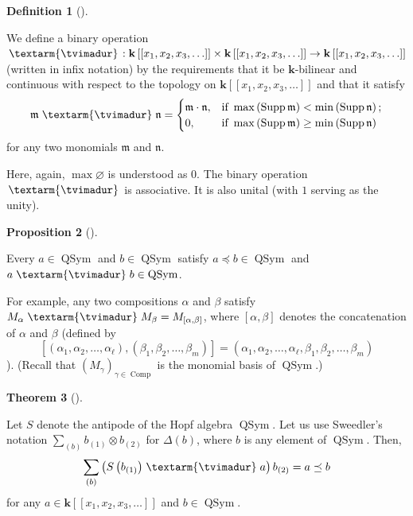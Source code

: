 \documentclass
[numbers=enddot,12pt,final,onecolumn,notitlepage,abstracton]{scrartcl}%
\theoremstyle{definition}
\newtheorem{theo}{Theorem}[section]
\newenvironment{theorem}[1][]
{\begin{theo}[#1]\begin{leftbar}}
{\end{leftbar}\end{theo}}
\newtheorem{prop}[theo]{Proposition}
\newenvironment{proposition}[1][]
{\begin{prop}[#1]\begin{leftbar}}
{\end{leftbar}\end{prop}}
\newtheorem{defi}[theo]{Definition}
\newenvironment{definition}[1][]
{\begin{defi}[#1]\begin{leftbar}}
{\end{leftbar}\end{defi}}
\newenvironment{verlong}{}{}
\newcommand{\tvi}{\left. \textarm{\tvimadur} \right.}
\let\sumnonlimits\sum
\renewcommand{\sum}{\sumnonlimits\limits}
\begin{document}
\begin{verlong}
\begin{definition}
We define a binary operation $\tvi :\mathbf{k}\left[  \left[  x_{1}%
,x_{2},x_{3},\ldots\right]  \right]  \times\mathbf{k}\left[  \left[
x_{1},x_{2},x_{3},\ldots\right]  \right]  \rightarrow\mathbf{k}\left[  \left[
x_{1},x_{2},x_{3},\ldots\right]  \right]  $ (written in infix notation) by the
requirements that it be $\mathbf{k}$-bilinear and continuous with respect to
the topology on $\mathbf{k}\left[  \left[  x_{1},x_{2},x_{3},\ldots\right]
\right]  $ and that it satisfy%
\[
\mathfrak{m} \tvi \mathfrak{n}=
\begin{cases}
\mathfrak{m}\cdot\mathfrak{n}, & \text{if }\max\left(  \operatorname*{Supp}%
\mathfrak{m}\right)  <\min\left(  \operatorname*{Supp}\mathfrak{n}\right)  ;\\
0, & \text{if }\max\left(  \operatorname*{Supp}\mathfrak{m}\right)  \geq
\min\left(  \operatorname*{Supp}\mathfrak{n}\right)
\end{cases}
\]
for any two monomials $\mathfrak{m}$ and $\mathfrak{n}$.
\end{definition}

Here, again, $\max\varnothing$ is understood as $0$. The binary operation
$\tvi$ is associative. It is also unital (with $1$ serving as the unity).

\begin{proposition}
Every $a\in\operatorname*{QSym}$ and $b\in\operatorname*{QSym}$ satisfy
$a\left.  \preceq\right.  b\in\operatorname*{QSym}$ and $a \tvi b\in
\operatorname*{QSym}$.
\end{proposition}

For example, any two compositions $\alpha$ and $\beta$ satisfy $M_{\alpha
}\tvi
M_{\beta}=M_{\left[  \alpha,\beta\right]  }$, where $\left[  \alpha
,\beta\right]  $ denotes the concatenation of $\alpha$ and $\beta$ (defined
by
\[
\left[  \left(  \alpha_{1},\alpha_{2},\ldots,\alpha_{\ell}\right)  ,\left(
\beta_{1},\beta_{2},\ldots,\beta_{m}\right)  \right]  =\left(  \alpha
_{1},\alpha_{2},\ldots,\alpha_{\ell},\beta_{1},\beta_{2},\ldots,\beta
_{m}\right)
\]
). (Recall that $\left(  M_{\gamma}\right)  _{\gamma\in\operatorname*{Comp}}$
is the monomial basis of $\operatorname*{QSym}$.)

\begin{theorem}
\label{thm.tvidend}Let $S$ denote the antipode of the Hopf algebra
$\operatorname*{QSym}$. Let us use Sweedler's notation $\sum_{\left(
b\right)  }b_{\left(  1\right)  }\otimes b_{\left(  2\right)  }$ for
$\Delta\left(  b\right)  $, where $b$ is any element of $\operatorname*{QSym}%
$. Then,%
\[
\sum_{\left(  b\right)  }\left(  S\left(  b_{\left(  1\right)  }\right)
\tvi a\right)  b_{\left(  2\right)  }=a\left.  \preceq\right.  b
\]
for any $a\in\mathbf{k}\left[  \left[  x_{1},x_{2},x_{3},\ldots\right]
\right]  $ and $b\in\operatorname*{QSym}$.
\end{theorem}


\end{verlong}
\end{document}
